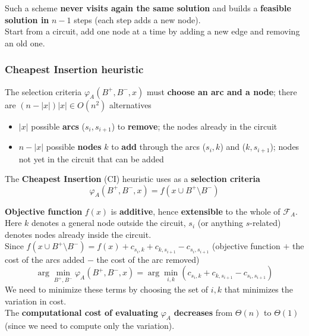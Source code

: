 Such a scheme \textbf{never visits again the same solution} and builds a \textbf{feasible solution in} $n - 1$ steps (each step adds a new node).\\

Start from a circuit, add one node at a time by adding a new edge and removing an old one.\\

\newpage

\subsubsection{Cheapest Insertion heuristic} 
The selection criteria $\varphi_A (B^+, B^-, x)$ must \textbf{choose an arc and a node}; there are $(n − |x|) |x| \in O (n^2)$ alternatives
\begin{itemize}
	\item $|x|$ possible \textbf{arcs} ($s_i , s_{i+1}$) to \textbf{remove}; the nodes already in the circuit
	\item $n − |x|$ possible \textbf{nodes} $k$ to \textbf{add} through the arcs ($s_i , k$) and ($k, s_{i+1}$); nodes not yet in the circuit that can be added
\end{itemize}

The \textbf{Cheapest Insertion} (CI) heuristic uses as a \textbf{selection criteria}
$$ \varphi_A (B^+, B^-, x) = f \left(x \cup B^+ \setminus B^- \right) $$

\textbf{Objective function} $f (x)$ is \textbf{additive}, hence \textbf{extensible} to the whole of $\mathcal{F}_A$.\\

Here $k$ denotes a general node outside the circuit, $s_i$ (or anything $s$-related) denotes nodes already inside the circuit.\\

Since $f (x \cup B^+ \setminus B^-) = f (x) + c_{s_i ,k} + c_{k,s_{i+1}} - c_{s_i ,s_{i+1}}$ (objective function $+$ the cost of the arcs added $-$ the cost of the arc removed)
$$ \arg \min_{B^+, B^-} \varphi_A \left(B^+, B^-, x \right) = \arg \min_{i,k} (c_{s_i, k} + c_{k, s_{i+1}} - c_{s_i, s_{i+1}})$$
We need to minimize these terms by choosing the set of $i,k$ that minimizes the variation in cost. \\

The \textbf{computational cost of evaluating} $\varphi_A$ \textbf{decreases} from $\Theta (n)$ to $\Theta (1)$ (since we need to compute only the variation).\\

